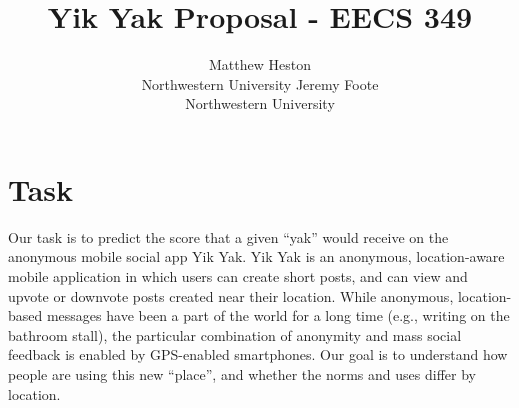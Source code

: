 \documentclass{sigchi}
\begin{document}
\title{Yik Yak Proposal - EECS 349}

 \author{ \alignauthor Matthew Heston\\ Northwestern
University \alignauthor Jeremy Foote\\ Northwestern University }

\toappear{} \maketitle



\section{Task}

Our task is to predict the score that a given ``yak'' would receive on the
anonymous mobile social app Yik Yak. Yik Yak is an anonymous, location-aware
mobile application in which users can create short posts, and can view and
upvote or downvote posts created near their location. While anonymous,
location-based messages have been a part of the world for a long time (e.g.,
writing on the bathroom stall), the particular combination of anonymity and mass
social feedback is enabled by GPS-enabled smartphones. Our goal is to understand
how people are using this new ``place'', and whether the norms and uses differ
by location.
\end{document}

